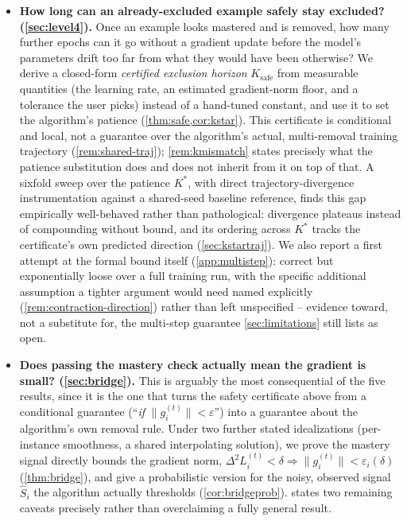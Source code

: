 \documentclass{article}
\theoremstyle{plain}
\theoremstyle{definition}
\theoremstyle{remark}
\begin{document}
\begin{itemize}
\item \textbf{How long can an already-excluded example safely stay excluded? (\cref{sec:level4}).} Once an example looks mastered and is removed, how many further epochs can it go without a gradient update before the model's parameters drift too far from what they would have been otherwise? We derive a closed-form \emph{certified exclusion horizon} $K_{\mathrm{safe}}$ from measurable quantities (the learning rate, an estimated gradient-norm floor, and a tolerance the user picks) instead of a hand-tuned constant, and use it to set the algorithm's patience (\cref{thm:safe,cor:kstar}). This certificate is conditional and local, not a guarantee over the algorithm's actual, multi-removal training trajectory (\cref{rem:shared-traj}); \cref{rem:kmismatch} states precisely what the patience substitution does and does not inherit from it on top of that. A sixfold sweep over the patience $K^*$, with direct trajectory-divergence instrumentation against a shared-seed baseline reference, finds this gap empirically well-behaved rather than pathological: divergence plateaus instead of compounding without bound, and its ordering across $K^*$ tracks the certificate's own predicted direction (\cref{sec:kstartraj}). We also report a first attempt at the formal bound itself (\cref{app:multistep}): correct but exponentially loose over a full training run, with the specific additional assumption a tighter argument would need named explicitly (\cref{rem:contraction-direction}) rather than left unspecified -- evidence toward, not a substitute for, the multi-step guarantee \cref{sec:limitations} still lists as open.
\item \textbf{Does passing the mastery check actually mean the gradient is small? (\cref{sec:bridge}).} This is arguably the most consequential of the five results, since it is the one that turns the safety certificate above from a conditional guarantee (``\emph{if} $\|g_i^{(t)}\|<\varepsilon$'') into a guarantee about the algorithm's own removal rule. Under two further stated idealizations (per-instance smoothness, a shared interpolating solution), we prove the mastery signal directly bounds the gradient norm, $\Delta^2 L_i^{(t)}<\delta \Rightarrow \|g_i^{(t)}\|<\varepsilon_i(\delta)$ (\cref{thm:bridge}), and give a probabilistic version for the noisy, observed signal $\hat S_i$ the algorithm actually thresholds (\cref{cor:bridgeprob}).  states two remaining caveats precisely rather than overclaiming a fully general result.
\end{itemize}
\end{document}
